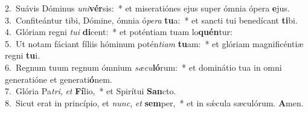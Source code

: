 {2.~}Suávis Dóminus \textit{u}\textit{ni}\textbf{vér}sis:~* et miseratiónes ejus super ómnia ópera \textbf{e}jus.\\
{3.~}Confiteántur tibi, Dómine, ómnia ó\textit{pe}\textit{ra} \textbf{tu}a:~* et sancti tui benedícant \textbf{ti}bi.\\
{4.~}Glóriam regni \textit{tu}\textit{i} \textbf{di}cent:~* et poténtiam tuam lo\textbf{quén}tur:\\
{5.~}Ut notam fáciant fíliis hóminum potén\textit{ti}\textit{am} \textbf{tu}am:~* et glóriam magnificéntiæ regni \textbf{tu}i.\\
{6.~}Regnum tuum regnum ómnium \textit{sæ}\textit{cu}\textbf{ló}rum:~* et dominátio tua in omni generatióne et generati\textbf{ó}nem.\\
{7.~}Glória Pa\textit{tri}, \textit{et} \textbf{Fí}lio,~* et Spirítui \textbf{San}cto.\\
{8.~}Sicut erat in princípio, et \textit{nunc}, \textit{et} \textbf{sem}per,~* et in sǽcula sæculórum. \textbf{A}men.\\
